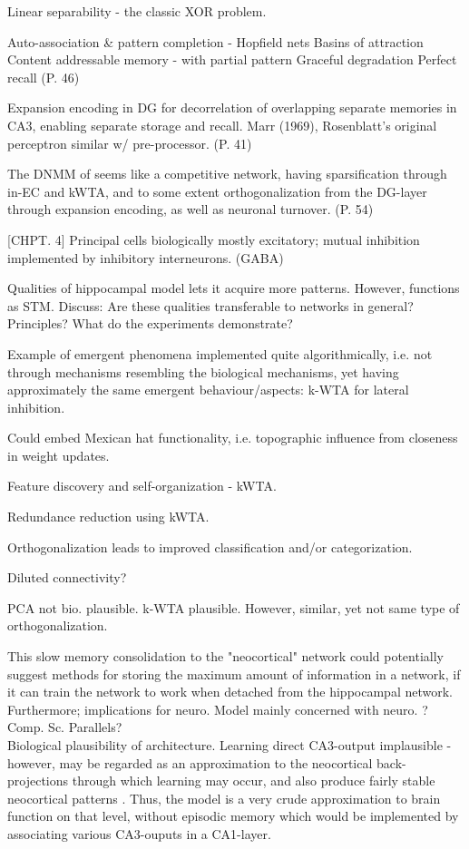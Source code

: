 Linear separability - the classic XOR problem.

Auto-association \& pattern completion - Hopfield nets
Basins of attraction
Content addressable memory - with partial pattern
Graceful degradation
Perfect recall (P. 46)

Expansion encoding in DG for decorrelation of overlapping separate memories in CA3, enabling separate storage and recall. Marr (1969), Rosenblatt's original perceptron similar w/ pre-processor. (P. 41)

The DNMM of \cite{Hattori2014} seems like a competitive network, having sparsification through in-EC and kWTA, and to some extent orthogonalization from the DG-layer through expansion encoding, as well as neuronal turnover. (P. 54)

[CHPT. 4]
Principal cells biologically mostly excitatory; mutual inhibition implemented by inhibitory interneurons. (GABA)

Qualities of hippocampal model lets it acquire more patterns. However, functions as STM. Discuss: Are these qualities transferable to networks in general? Principles? What do the experiments demonstrate?

Example of emergent phenomena implemented quite algorithmically, i.e. not through mechanisms resembling the biological mechanisms, yet having approximately the same emergent behaviour/aspects: k-WTA for lateral inhibition.

Could embed Mexican hat functionality, i.e. topographic influence from closeness in weight updates.

Feature discovery and self-organization - kWTA.

Redundance reduction using kWTA.

Orthogonalization leads to improved classification and/or categorization.

Diluted connectivity?

PCA not bio. plausible. k-WTA plausible. However, similar, yet not same type of orthogonalization.

This slow memory consolidation to the "neocortical" network could potentially suggest methods for storing the maximum amount of information in a network, if it can train the network to work when detached from the hippocampal network.
\\
Furthermore; implications for neuro. Model mainly concerned with neuro. ? Comp. Sc. Parallels?
\\

Biological plausibility of \citep{McClelland1995} architecture. Learning direct CA3-output implausible - however, may be regarded as an approximation to the neocortical back-projections through which learning may occur, and also produce fairly stable neocortical patterns \citep{Rolls1998chpt6}. Thus, the model is a very crude approximation to brain function on that level, without episodic memory which would be implemented by associating various CA3-ouputs in a CA1-layer.

